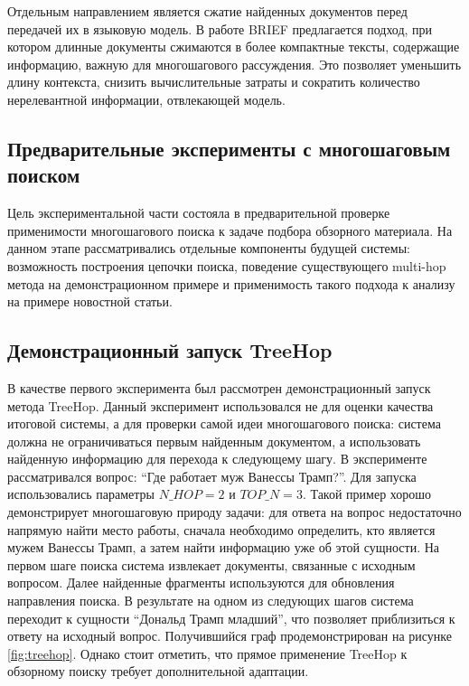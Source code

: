 \documentclass[oneside,senior,etd]{BYUPhys}
\begin{document}
Отдельным направлением является сжатие найденных документов перед передачей их в языковую модель. 
В работе BRIEF \cite{li2024brief} предлагается подход, при котором длинные документы сжимаются в более компактные тексты, содержащие информацию, важную для многошагового рассуждения. 
Это позволяет уменьшить длину контекста, снизить вычислительные затраты и сократить количество нерелевантной информации, отвлекающей модель.

\subsection{Предварительные эксперименты с многошаговым поиском}

Цель экспериментальной части состояла в предварительной проверке применимости многошагового поиска к задаче подбора обзорного материала. 
На данном этапе рассматривались отдельные компоненты будущей системы: возможность построения цепочки поиска, поведение существующего multi-hop метода на демонстрационном примере и применимость такого подхода к анализу на примере новостной статьи.

\subsection{Демонстрационный запуск TreeHop}

В качестве первого эксперимента был рассмотрен демонстрационный запуск метода TreeHop. 
Данный эксперимент использовался не для оценки качества итоговой системы, а для проверки самой идеи многошагового поиска: 
система должна не ограничиваться первым найденным документом, а использовать найденную информацию для перехода к следующему шагу.
В эксперименте рассматривался вопрос: ``Где работает муж Ванессы Трамп?''. 
Для запуска использовались параметры $N\_HOP = 2$ и $TOP\_N = 3$. 
Такой пример хорошо демонстрирует многошаговую природу задачи: для ответа на вопрос недостаточно напрямую найти место работы, сначала необходимо определить, 
кто является мужем Ванессы Трамп, а затем найти информацию уже об этой сущности.
На первом шаге поиска система извлекает документы, связанные с исходным вопросом. 
Далее найденные фрагменты используются для обновления направления поиска. 
В результате на одном из следующих шагов система переходит к сущности ``Дональд Трамп младший'', 
что позволяет приблизиться к ответу на исходный вопрос.
Получившийся граф продемонстрирован на рисунке \ref{fig:treehop}.
Однако стоит отметить, что прямое применение TreeHop к обзорному поиску требует дополнительной адаптации.
\end{document}
